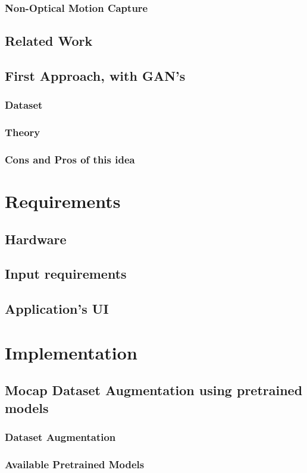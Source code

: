 \documentclass[12pt,oneside,a4paper,english]{article}
\begin{document}
\subsubsection{Non-Optical Motion Capture}
 
\subsection{Related Work}
\subsection{First Approach, with GAN's}
\subsubsection{Dataset}
\subsubsection{Theory}
\subsubsection{Cons and Pros of this idea}
\newpage
\section{Requirements}
\subsection{Hardware}
\subsection{Input requirements}
\subsection{Application's UI}
\newpage
\section{Implementation}
\subsection{Mocap Dataset Augmentation using pretrained models}
\subsubsection{Dataset Augmentation}
\subsubsection{Available Pretrained Models}
\end{document}
